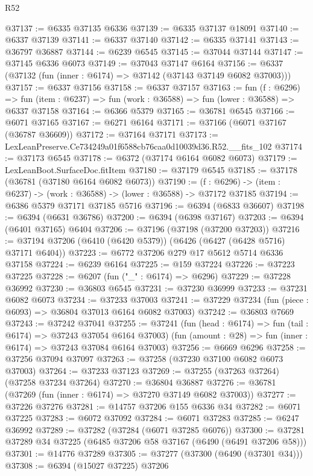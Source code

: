 \begin{lexlean}{R52}
\begin{coremodule}
@37137 := @6335 @37135 @6336
@37139 := @6335 @37137 @18091
@37140 := @6337 @37139
@37141 := @6337 @37140
@37142 := @6335 @37141
@37143 := @36797 @36887
@37144 := @6239 @6545
@37145 := @37044 @37144
@37147 := @37145 @6336 @6073
@37149 := @37043 @37147 @6164
@37156 := @6337 (@37132 (fun (inner : @6174) => @37142 (@37143 @37149 @6082 @37003)))
@37157 := @6337 @37156
@37158 := @6337 @37157
@37163 := fun (f : @6296) =>
  fun (item : @6237) => fun (work : @36588) => fun (lower : @36588) => @6337 @37158
@37164 := @6366 @5379
@37165 := @36781 @6545
@37166 := @6071 @37165
@37167 := @6271 @6164
@37171 := @37166 (@6071 @37167 (@36787 @36609))
@37172 := @37164 @37171
@37173 := LexLeanPreserve.Ce734249a01f6588cb76caa0d10039d36.R52.__fits_102
@37174 := @37173 @6545
@37178 := @6372 (@37174 @6164 @6082 @6073)
@37179 := LexLeanBoot.SurfaceDoc.fitItem
@37180 := @37179 @6545
@37185 := @37178 (@36781 (@37180 @6164 @6082 @6073))
@37190 := (f : @6296) -> (item : @6237) -> (work : @36588) -> (lower : @36588) -> @37172 @37185
@37194 := @6386 @5379 @37171 @37185 @5716
@37196 := @6394 (@6833 @36607)
@37198 := @6394 (@6631 @36786)
@37200 := @6394 (@6398 @37167)
@37203 := @6394 (@6401 @37165) @6404
@37206 := @37196 (@37198 (@37200 @37203))
@37216 := @37194 @37206 (@6410 (@6420 @5379)) (@6426 (@6427 (@6428 @5716) @37171 @6404))
@37223 := @6772 @37206 @279 @17 @5612 @5714 @6336 @37158
@37224 := @6239 @6164
@37225 := @159 @37224
@37226 := @37223 @37225
@37228 := @6207 (fun ("_" : @6174) => @6296)
@37229 := @37228 @36992
@37230 := @36803 @6545
@37231 := @37230 @36999
@37233 := @37231 @6082 @6073
@37234 := @37233 @37003
@37241 := @37229 @37234 (fun (piece : @6093) => @36804 @37013 @6164 @6082 @37003)
@37242 := @36803 @7669
@37243 := @37242 @37041
@37255 := @37241
    (fun (head : @6174) => fun (tail : @6174) => @37243 @37054 @6164 @37003)
    (fun (amount : @28) => fun (inner : @6174) => @37243 @37084 @6164 @37003)
@37256 := @6669 @6296
@37258 := @37256 @37094 @37097
@37263 := @37258 (@37230 @37100 @6082 @6073 @37003)
@37264 := @37233 @37123
@37269 := @37255 (@37263 @37264) (@37258 @37234 @37264)
@37270 := @36804 @36887
@37276 := @36781 (@37269 (fun (inner : @6174) => @37270 @37149 @6082 @37003))
@37277 := @37226 @37276
@37281 := @14757 @37206 @155 @6336 @34
@37282 := @6071 @37225
@37283 := @6072 @37092
@37284 := @6071 @37283
@37285 := @6247 @36992
@37289 := @37282 (@37284 (@6071 @37285 @6076))
@37300 := @37281 @37289 @34 @37225 (@6485 @37206 @58 @37167 (@6490 (@6491 @37206 @58)))
@37301 := @14776 @37289
@37305 := @37277 (@37300 (@6490 (@37301 @34)))
@37308 := @6394 (@15027 @37225) @37206

\end{coremodule}
\end{lexlean}
